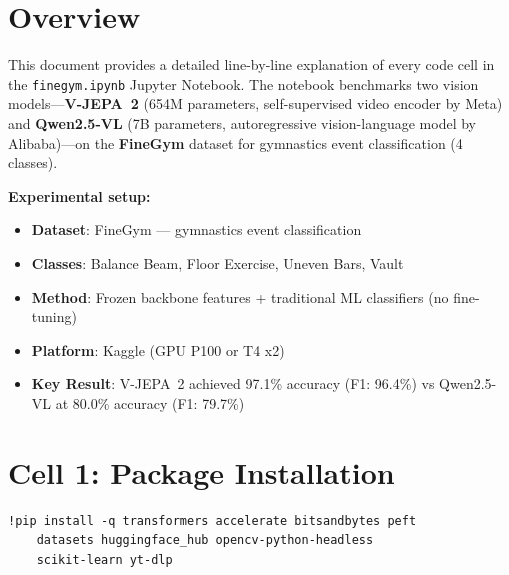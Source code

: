 

\section{Overview}

This document provides a detailed line-by-line explanation of every code cell in the \texttt{finegym.ipynb} Jupyter Notebook. The notebook benchmarks two vision models---\textbf{V-JEPA~2} (654M parameters, self-supervised video encoder by Meta) and \textbf{Qwen2.5-VL} (7B parameters, autoregressive vision-language model by Alibaba)---on the \textbf{FineGym} dataset for gymnastics event classification (4 classes).

\textbf{Experimental setup:}
\begin{itemize}[nosep]
  \item \textbf{Dataset}: FineGym --- gymnastics event classification
  \item \textbf{Classes}: Balance Beam, Floor Exercise, Uneven Bars, Vault
  \item \textbf{Method}: Frozen backbone features + traditional ML classifiers (no fine-tuning)
  \item \textbf{Platform}: Kaggle (GPU P100 or T4 x2)
  \item \textbf{Key Result}: V-JEPA~2 achieved 97.1\% accuracy (F1: 96.4\%) vs Qwen2.5-VL at 80.0\% accuracy (F1: 79.7\%)
\end{itemize}

\newpage
\section{Cell 1: Package Installation}

\begin{lstlisting}
!pip install -q transformers accelerate bitsandbytes peft
    datasets huggingface_hub opencv-python-headless
    scikit-learn yt-dlp
\end{lstlisting}

